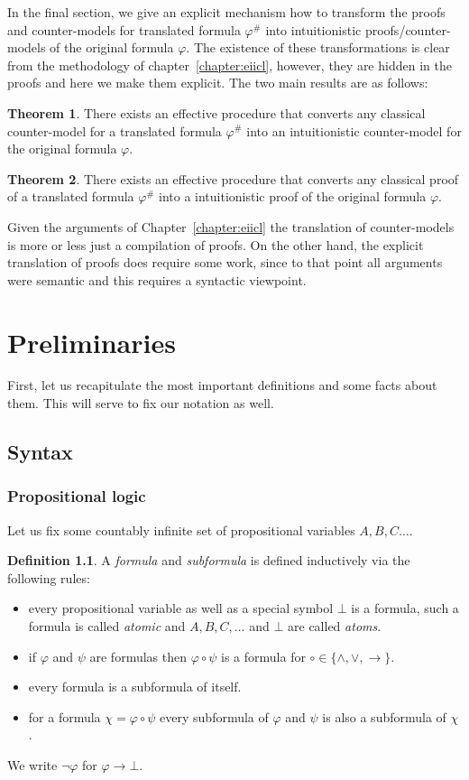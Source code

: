 \documentclass[a4paper,11pt]{report}
\theoremstyle{definition}
\newtheorem{theorem}{Theorem}[section]
\theoremstyle{definition}
\theoremstyle{definition}
\theoremstyle{definition}
\theoremstyle{definition}
\newtheorem{definition}[theorem]{Definition}
\theoremstyle{definition}
\theoremstyle{definition}
\begin{document}
	In the final section, we give an explicit mechanism how to transform the proofs and counter-models for translated formula $\varphi^\#$ into intuitionistic proofs/counter-models of the original formula $\varphi$. The existence of these transformations is clear from the methodology of chapter~\ref{chapter:eiicl}, however, they are hidden in the proofs and here we make them explicit. The two main results are as follows:
	\begin{theorem}
		There exists an effective procedure that converts any classical counter-model for a translated formula $\varphi^\#$ into an intuitionistic counter-model for the original formula $\varphi$.
	\end{theorem}
	\begin{theorem}
		There exists an effective procedure that converts any classical proof of a translated formula $\varphi^\#$ into a intuitionistic proof of the original formula $\varphi$.
	\end{theorem}
	
	Given the arguments of Chapter~\ref{chapter:eiicl} the translation of counter-models is more or less just a compilation of proofs. On the other hand, the explicit translation of proofs does require some work, since to that point all arguments were semantic and this requires a syntactic viewpoint.

	\chapter{Preliminaries}
	First, let us recapitulate the most important definitions and some facts about them. This will serve to fix our notation as well.
	
	\section{Syntax}
	
	\subsection{Propositional logic}
	
	Let us fix some countably infinite set of propositional variables $A, B, C\dots$.
	
	\begin{definition}
		A \textit{formula} and \textit{subformula} is defined inductively via the following rules:
		\begin{itemize}
			\item every propositional variable as well as a special symbol $\bot$ is a formula, such a formula is called \textit{atomic} and $A,B,C,\dots$ and $\bot$ are called \textit{atoms}.
			\item if $\varphi$ and $\psi$ are formulas then $\varphi\circ\psi$ is a formula for $\circ\in\{\wedge,\vee,\to\}$.
			\item every formula is a subformula of itself.
			\item for a formula $\chi = \varphi\circ\psi$ every subformula of $\varphi$ and $\psi$ is also a subformula of $\chi$.
		\end{itemize}
	We write $\neg \varphi$ for $\varphi\to \bot$.
	\end{definition}
\end{document}
